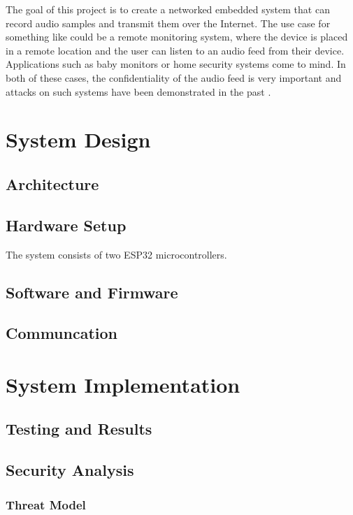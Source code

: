 \documentclass[conference]{IEEEtran}
\begin{document}
The goal of this project is to create a networked embedded system that can record audio samples and transmit them over the Internet.
The use case for something like could be a remote monitoring system, where the device is placed in a remote location and 
the user can listen to an audio feed from their device. Applications such as baby monitors or home security systems come to mind.
In both of these cases, the confidentiality of the audio feed is very important and
attacks on such systems have been demonstrated in the past \cite{BabyMonitorHack, VideoSurvAttacks}.

\section{System Design}
\label{sec:system_design}

\subsection{Architecture}
\subsection{Hardware Setup}
The system consists of two ESP32\cite{ESP32_Manual} microcontrollers.
\subsection{Software and Firmware}
\subsection{Communcation}

\section{System Implementation}
\label{sec:system_implementation}
\subsection{Testing and Results}
\label{subsec:testing_and_results}
\subsection{Security Analysis}
\label{subsec:security_analysis}

\subsubsection{Threat Model}
\end{document}
